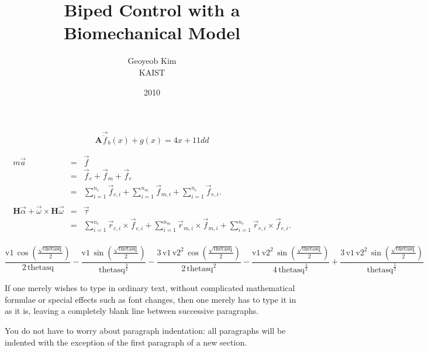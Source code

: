 \documentclass[a4paper,10pt]{article}
\begin{document}
\title{Biped Control with a Biomechanical Model}

\author{Geoyeob Kim\\
KAIST
}
\date{2010}
\maketitle


\begin{equation}
\mathbf{A}\vec{\ddot{f}}_b(x) + g(x) = 4x + 11dd
\end{equation}

\begin{eqnarray*}
m\vec{a} & = & \vec{f} \\
         & = & \vec{f}_c+\vec{f}_m+\vec{f}_e \\
         & = & \sum_{i=1}^{n_c}{\vec{f}_{c,i}} + \sum_{i=1}^{n_m}{\vec{f}_{m,i}} + \sum_{i=1}^{n_e}{\vec{f}_{e,i}}. \\
\\
\mathbf{H}\vec\alpha + \vec\omega\times\mathbf{H}\vec\omega
         & = & \vec\tau \\
         & = & \sum_{i=1}^{n_c}{\vec{r}_{c,i}\times\vec{f}_{c,i}} + \sum_{i=1}^{n_m}{\vec{r}_{m,i}\times\vec{f}_{m,i}} + \sum_{i=1}^{n_e}{\vec{r}_{e,i}\times\vec{f}_{e,i}}. \\
\end{eqnarray*}

\begin{equation}
\frac{\mathrm{v1}\, \cos\!\left(\frac{\sqrt{\mathrm{thetasq}}}{2}\right)}{2\, \mathrm{thetasq}} - \frac{\mathrm{v1}\, \sin\!\left(\frac{\sqrt{\mathrm{thetasq}}}{2}\right)}{{\mathrm{thetasq}}^{\frac{3}{2}}} - \frac{3\, \mathrm{v1}\, {\mathrm{v2}}^2\, \cos\!\left(\frac{\sqrt{\mathrm{thetasq}}}{2}\right)}{2\, {\mathrm{thetasq}}^2} - \frac{\mathrm{v1}\, {\mathrm{v2}}^2\, \sin\!\left(\frac{\sqrt{\mathrm{thetasq}}}{2}\right)}{4\, {\mathrm{thetasq}}^{\frac{3}{2}}} + \frac{3\, \mathrm{v1}\, {\mathrm{v2}}^2\, \sin\!\left(\frac{\sqrt{\mathrm{thetasq}}}{2}\right)}{{\mathrm{thetasq}}^{\frac{5}{2}}}
\end{equation}


If one merely wishes to type in ordinary text, without
complicated mathematical formulae or special effects such
as font changes, then one merely has to type it in as it
is, leaving a completely blank line between successive
paragraphs.

You do not have to worry about paragraph indentation:
all paragraphs will be indented with the exception of
the first paragraph of a new section.
\end{document}
